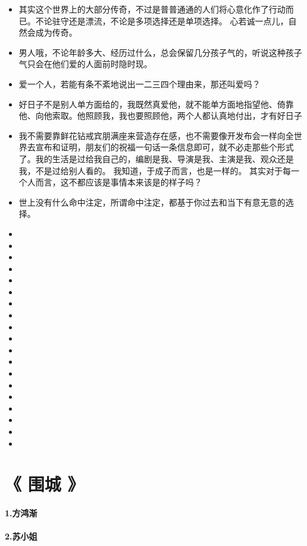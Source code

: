 \documentclass[UTF8,a4paper,8pt]{ctexbook}
\begin{document}
\begin{itemize}
				\item 其实这个世界上的大部分传奇，不过是普普通通的人们将心意化作了行动而已。不论驻守还是漂流，不论是多项选择还是单项选择。 心若诚一点儿，自然会成为传奇。
				\item 男人哦，不论年龄多大、经历过什么，总会保留几分孩子气的，听说这种孩子气只会在他们爱的人面前时隐时现。
				\item 爱一个人，若能有条不紊地说出一二三四个理由来，那还叫爱吗？
				\item 好日子不是别人单方面给的，我既然真爱他，就不能单方面地指望他、倚靠他、向他索取。他照顾我，我也要照顾他，两个人都认真地付出，才有好日子
				\item 我不需要靠鲜花钻戒宾朋满座来营造存在感，也不需要像开发布会一样向全世界去宣布和证明，朋友们的祝福一句话一条信息即可，就不必走那些个形式了。我的生活是过给我自己的，编剧是我、导演是我、主演是我、观众还是我，不是过给别人看的。 我知道，于成子而言，也是一样的。 其实对于每一个人而言，这不都应该是事情本来该是的样子吗？
				\item 世上没有什么命中注定，所谓命中注定，都基于你过去和当下有意无意的选择。
				\item
				\item 
				\item 
				\item 
				\item 
				\item 
				\item 
				\item
				\item 
				\item 
				\item 
				\item 
				\item 
				\item 
				\item
				\item 
				\item 
				\item 
				\item 
			\end{itemize}
			
		\newpage			
	\section{《 围城 》 }  			
		\paragraph{1.方鸿渐}
		\paragraph{2.苏小姐}
\end{document}
